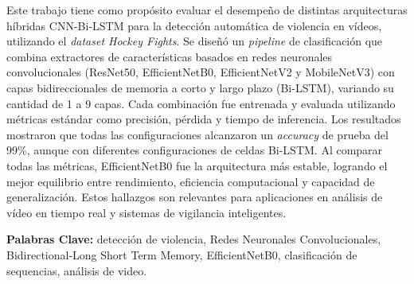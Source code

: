 Este trabajo tiene como propósito evaluar el desempeño de 
distintas arquitecturas híbridas CNN-Bi-LSTM para la detección 
automática de violencia en vídeos, utilizando el 
\textit{dataset Hockey Fights}. Se diseñó un \textit{pipeline} 
de clasificación que combina extractores de características 
basados en redes neuronales convolucionales (ResNet50, 
EfficientNetB0, EfficientNetV2 y MobileNetV3) con capas 
bidireccionales de memoria a corto y largo plazo (Bi-LSTM), 
variando su cantidad de 1 a 9 capas. Cada combinación fue 
entrenada y evaluada utilizando métricas estándar como precisión, 
pérdida y tiempo de inferencia. Los resultados mostraron que 
todas las configuraciones alcanzaron un \textit{accuracy} de 
prueba del 99\%, aunque con diferentes configuraciones de 
celdas Bi-LSTM. Al comparar todas las métricas, EfficientNetB0 
fue la arquitectura más estable, logrando el mejor equilibrio 
entre rendimiento, eficiencia computacional y capacidad de 
generalización. Estos hallazgos son relevantes para aplicaciones 
en análisis de vídeo en tiempo real y sistemas de vigilancia 
inteligentes.

{\bf Palabras Clave:} detección de violencia, Redes Neuronales Convolucionales,
Bidirectional-Long Short Term Memory, EfficientNetB0, 
clasificación de sequencias, análisis de video.
